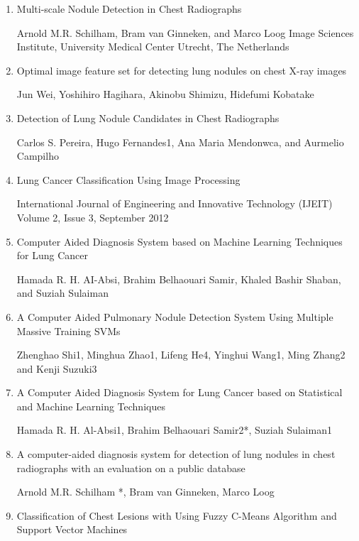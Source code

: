 \documentclass[hidelinks,12pt]{article}
\begin{document}
\begin{enumerate}
\item Multi-scale Nodule Detection in Chest Radiographs

Arnold M.R. Schilham, Bram van Ginneken, and Marco Loog
Image Sciences Institute, University Medical Center Utrecht, The Netherlands\label{1}

\item Optimal image feature set for detecting lung nodules on chest X-ray images 

Jun Wei, Yoshihiro Hagihara, Akinobu Shimizu, Hidefumi Kobatake\label{2}


\item Detection of Lung Nodule Candidates in Chest Radiographs

Carlos S. Pereira, Hugo Fernandes1, Ana Maria Mendonwca,
and Aurmelio Campilho\label{3}


\item Lung Cancer Classification Using Image Processing 

International Journal of Engineering and Innovative Technology (IJEIT) Volume 2, Issue 3, September 2012 \label{4}


\item Computer Aided Diagnosis System based on Machine Learning Techniques for Lung Cancer \label{5}

Hamada R. H. AI-Absi, Brahim Belhaouari Samir, Khaled Bashir Shaban, and Suziah Sulaiman 

\item A Computer Aided Pulmonary Nodule Detection System Using Multiple Massive Training SVMs\label{6}

Zhenghao Shi1, Minghua Zhao1, Lifeng He4, Yinghui Wang1, Ming Zhang2 and Kenji Suzuki3

\item A Computer Aided Diagnosis System for Lung Cancer based on Statistical and Machine Learning Techniques \label{7}

Hamada R. H. Al-Absi1, Brahim Belhaouari Samir2*, Suziah Sulaiman1

\item A computer-aided diagnosis system for detection of lung nodules in chest radiographs with an evaluation on a public database\label{8}

Arnold M.R. Schilham *, Bram van Ginneken, Marco Loog

\item Classification of Chest Lesions with Using Fuzzy  C-Means Algorithm and Support Vector Machines \label{10}


\end{enumerate}
\end{document}
